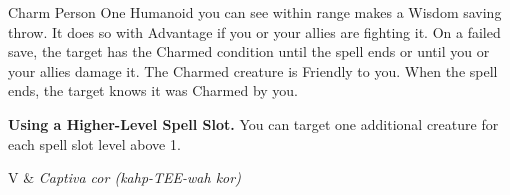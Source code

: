 \begin{Spell}[
  level=1st,
  time=1 Action,
  range=30 ft.,
  components={V, S},
  duration=1 Hour,
  school=Enchantment,
  attack=WIS Save,
  effect=Charmed
]{Charm Person}
One Humanoid you can see within range makes a Wisdom saving throw. It does so with Advantage if you or your allies are fighting it. On a failed save, the target has the Charmed condition until the spell ends or until you or your allies damage it. The Charmed creature is Friendly to you. When the spell ends, the target knows it was Charmed by you.

\textbf{Using a Higher-Level Spell Slot.} You can target one additional creature for each spell slot level above 1.

\begin{components}
V & \textit{Captiva cor (kahp-TEE-wah kor)}
\end{components}
\end{Spell}


